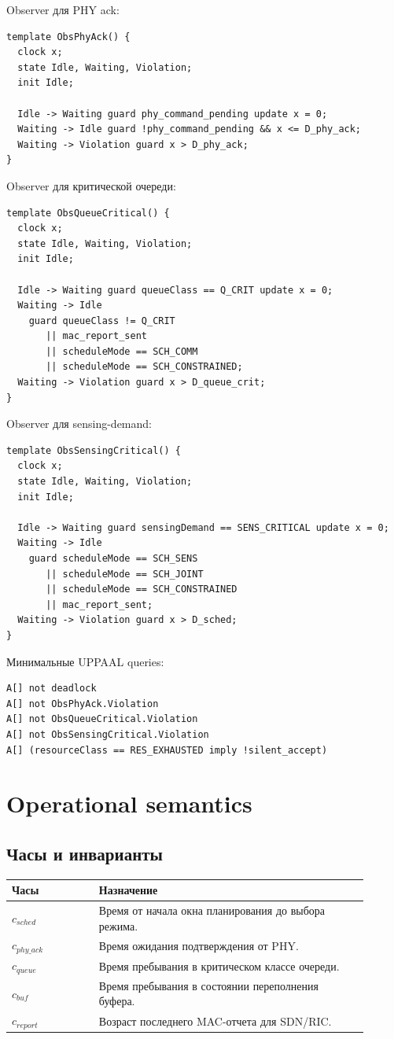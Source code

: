 \documentclass[10pt,a4paper]{article}
\begin{document}
Observer для PHY ack:
\begin{verbatim}
template ObsPhyAck() {
  clock x;
  state Idle, Waiting, Violation;
  init Idle;

  Idle -> Waiting guard phy_command_pending update x = 0;
  Waiting -> Idle guard !phy_command_pending && x <= D_phy_ack;
  Waiting -> Violation guard x > D_phy_ack;
}
\end{verbatim}

Observer для критической очереди:
\begin{verbatim}
template ObsQueueCritical() {
  clock x;
  state Idle, Waiting, Violation;
  init Idle;

  Idle -> Waiting guard queueClass == Q_CRIT update x = 0;
  Waiting -> Idle
    guard queueClass != Q_CRIT
       || mac_report_sent
       || scheduleMode == SCH_COMM
       || scheduleMode == SCH_CONSTRAINED;
  Waiting -> Violation guard x > D_queue_crit;
}
\end{verbatim}

Observer для sensing-demand:
\begin{verbatim}
template ObsSensingCritical() {
  clock x;
  state Idle, Waiting, Violation;
  init Idle;

  Idle -> Waiting guard sensingDemand == SENS_CRITICAL update x = 0;
  Waiting -> Idle
    guard scheduleMode == SCH_SENS
       || scheduleMode == SCH_JOINT
       || scheduleMode == SCH_CONSTRAINED
       || mac_report_sent;
  Waiting -> Violation guard x > D_sched;
}
\end{verbatim}

Минимальные UPPAAL queries:
\begin{verbatim}
A[] not deadlock
A[] not ObsPhyAck.Violation
A[] not ObsQueueCritical.Violation
A[] not ObsSensingCritical.Violation
A[] (resourceClass == RES_EXHAUSTED imply !silent_accept)
\end{verbatim}

\section{Operational semantics}

\subsection{Часы и инварианты}

\begin{longtable}{p{0.22\linewidth}p{0.68\linewidth}}
\hline
\textbf{Часы} & \textbf{Назначение}\\
\hline
\(c_{sched}\) & Время от начала окна планирования до выбора режима.\\
\(c_{phy\_ack}\) & Время ожидания подтверждения от PHY.\\
\(c_{queue}\) & Время пребывания в критическом классе очереди.\\
\(c_{buf}\) & Время пребывания в состоянии переполнения буфера.\\
\(c_{report}\) & Возраст последнего MAC-отчета для SDN/RIC.\\
\hline
\end{longtable}
\end{document}
